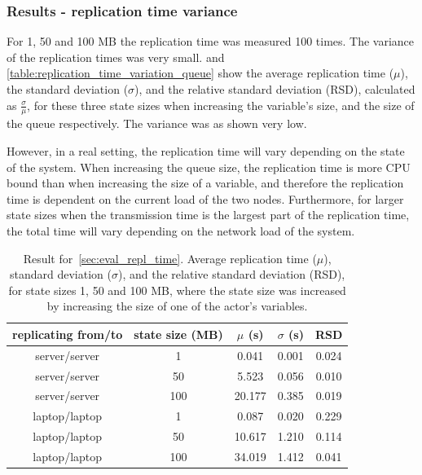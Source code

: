 \documentclass{cslthse-msc}
\begin{document}
\subsubsection*{Results - replication time variance}
For 1, 50 and 100 MB the replication time was measured 100 times. The variance of the replication times was very small.  and \cref{table:replication_time_variation_queue} show the average replication time ($\mu$), the standard deviation ($\sigma$), and the relative standard deviation (RSD), calculated as $\frac{\sigma}{\mu}$, for these three state sizes when increasing the variable's size, and the size of the queue respectively. The variance was as shown very low. 

However, in a real setting, the replication time will vary depending on the state of the system. When increasing the queue size, the replication time is more CPU bound than when increasing the size of a variable, and therefore the replication time is dependent on the current load of the two nodes. Furthermore, for larger state sizes when the transmission time is the largest part of the replication time, the total time will vary depending on the network load of the system.
 
 \begin{table}[h!]
	\begin{center}
	\begin{tabular}{| c | c | c | c | c |}
	 \hline
	 replicating from/to & state size (MB) & $\mu$ (s) & $\sigma$ (s) & RSD \\
	 \hline		%
	  server/server & 1 & 0.041 & 0.001 & 0.024 \\
	  server/server & 50 &  5.523 &  0.056 & 0.010 \\
	  server/server & 100 &  20.177 & 0.385 & 0.019 \\
	  laptop/laptop & 1 & 0.087 & 0.020 & 0.229 \\
	  laptop/laptop & 50 & 10.617 & 1.210 & 0.114 \\
	  laptop/laptop & 100 & 34.019 & 1.412 & 0.041 \\
	   \hline
	\end{tabular}
	 \caption[Average replication time, standard deviation and RSD in~\cref{sec:eval_repl_time}, increased variable size]{Result for~\cref{sec:eval_repl_time}. Average replication time ($\mu$), standard deviation ($\sigma$), and the relative standard deviation (RSD), for state sizes 1, 50 and 100 MB, where the state size was increased by increasing the size of one of the actor's variables.}
	 \label{table:replication_time_variation_variable}
	 \end{center}
 \end{table}
 
\end{document}
